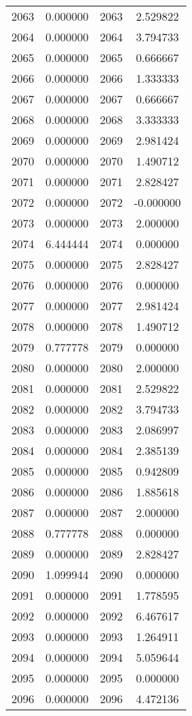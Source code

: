 \documentclass[12pt]{article}
\begin{document}
\begin{longtable}{@{}cccc@{}}
2063 & 0.000000 & 2063 & 2.529822 \\
2064 & 0.000000 & 2064 & 3.794733 \\
2065 & 0.000000 & 2065 & 0.666667 \\
2066 & 0.000000 & 2066 & 1.333333 \\
2067 & 0.000000 & 2067 & 0.666667 \\
2068 & 0.000000 & 2068 & 3.333333 \\
2069 & 0.000000 & 2069 & 2.981424 \\
2070 & 0.000000 & 2070 & 1.490712 \\
2071 & 0.000000 & 2071 & 2.828427 \\
2072 & 0.000000 & 2072 & -0.000000 \\
2073 & 0.000000 & 2073 & 2.000000 \\
2074 & 6.444444 & 2074 & 0.000000 \\
2075 & 0.000000 & 2075 & 2.828427 \\
2076 & 0.000000 & 2076 & 0.000000 \\
2077 & 0.000000 & 2077 & 2.981424 \\
2078 & 0.000000 & 2078 & 1.490712 \\
2079 & 0.777778 & 2079 & 0.000000 \\
2080 & 0.000000 & 2080 & 2.000000 \\
2081 & 0.000000 & 2081 & 2.529822 \\
2082 & 0.000000 & 2082 & 3.794733 \\
2083 & 0.000000 & 2083 & 2.086997 \\
2084 & 0.000000 & 2084 & 2.385139 \\
2085 & 0.000000 & 2085 & 0.942809 \\
2086 & 0.000000 & 2086 & 1.885618 \\
2087 & 0.000000 & 2087 & 2.000000 \\
2088 & 0.777778 & 2088 & 0.000000 \\
2089 & 0.000000 & 2089 & 2.828427 \\
2090 & 1.099944 & 2090 & 0.000000 \\
2091 & 0.000000 & 2091 & 1.778595 \\
2092 & 0.000000 & 2092 & 6.467617 \\
2093 & 0.000000 & 2093 & 1.264911 \\
2094 & 0.000000 & 2094 & 5.059644 \\
2095 & 0.000000 & 2095 & 0.000000 \\
2096 & 0.000000 & 2096 & 4.472136 \\

\end{longtable}
\end{document}
